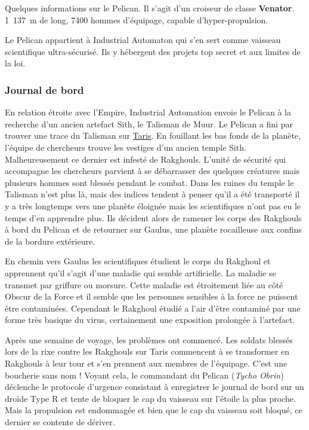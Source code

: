 Quelques informations sur le Pelican. Il s’agit d’un croiseur de classe \textbf{Venator}. 1~137~m de long, 7400 hommes d’équipage, capable d’hyper-propulsion.

Le Pelican appartient à Industrial Automaton qui s’en sert comme vaisseau scientifique ultra-sécurisé. Ils y hébergent des projets top secret et aux limites de la loi.

\subsubsection{Journal de bord}
\label{sec:pelican-jdb}
En relation étroite avec l’Empire, Industrial Automation envoie le Pelican à la recherche d’un ancien artefact Sith, le Talisman de Muur. Le Pelican a fini par trouver une trace du Talisman sur \href{http://fr.starwars.wikia.com/wiki/Taris}{Taris}. En fouillant les bas fonds de la planète, l’équipe de chercheurs trouve les vestiges d'un ancien temple Sith. Malheureusement ce dernier est infesté de Rakghouls. L’unité de sécurité qui accompagne les chercheurs parvient à se débarrasser des quelques créatures mais plusieurs hommes sont blessés pendant le combat. Dans les ruines du temple le Talisman n’est plus là, mais des indices tendent à penser qu’il a été transporté il y a très longtemps vers une planète éloignée mais les scientifiques n’ont pas eu le temps d’en apprendre plus. Ils décident alors de ramener les corps des Rakghouls à bord du Pelican et de retourner sur Gaulus, une planète rocailleuse aux confins de la bordure extérieure.

En chemin vers Gaulus les scientifiques étudient le corps du Rakghoul et apprennent qu’il s’agit d’une maladie qui semble artificielle. La maladie se transmet par griffure ou morsure. Cette maladie est étroitement liée au côté Obscur de la Force et il semble que les personnes sensibles à la force ne puissent être contaminées. Cependant le Rakghoul étudié a l’air d’être contaminé par une forme très basique du virus, certainement une exposition prolongée à l’artefact.

Après une semaine de voyage, les problèmes ont commencé. Les soldats blessés lors de la rixe contre les Rakghouls sur Taris commencent à se transformer en Rakghouls à leur tour et s’en prennent aux membres de l’équipage. C’est une boucherie sans nom ! Voyant cela, le commandant du Pelican (\emph{Tycho Obrin}) déclenche le protocole d’urgence consistant à enregistrer le journal de bord sur un droïde Type R et tente de bloquer le cap du vaisseau sur l’étoile la plus proche. Mais la propulsion est endommagée et bien que le cap du vaisseau soit bloqué, ce dernier se contente de dériver.

